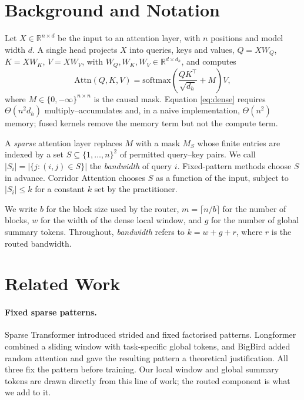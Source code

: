 \documentclass[11pt]{article}
\begin{document}
\section{Background and Notation}\label{sec:background}

Let $X \in \mathbb{R}^{n \times d}$ be the input to an attention layer, with
$n$ positions and model width $d$. A single head projects $X$ into queries,
keys and values, $Q = XW_Q$, $K = XW_K$, $V = XW_V$, with
$W_Q, W_K, W_V \in \mathbb{R}^{d \times d_h}$, and computes
\begin{equation}\label{eq:dense}
  \mathrm{Attn}(Q, K, V) = \mathrm{softmax}\!\left(
    \frac{QK^{\top}}{\sqrt{d_h}} + M \right) V,
\end{equation}
where $M \in \{0, -\infty\}^{n \times n}$ is the causal mask. Equation
\eqref{eq:dense} requires $\Theta(n^2 d_h)$ multiply--accumulates and, in a
naive implementation, $\Theta(n^2)$ memory; fused kernels
\citep{dao2022flashattention} remove the memory term but not the compute term.

A \emph{sparse} attention layer replaces $M$ with a mask $M_S$ whose finite
entries are indexed by a set $S \subseteq \{1,\dots,n\}^2$ of permitted
query--key pairs. We call $|S_i| = |\{j : (i,j) \in S\}|$ the
\emph{bandwidth} of query $i$. Fixed-pattern methods choose $S$ in advance.
Corridor Attention chooses $S$ as a function of the input, subject to
$|S_i| \le k$ for a constant $k$ set by the practitioner.

We write $b$ for the block size used by the router, $m = \lceil n/b \rceil$ for
the number of blocks, $w$ for the width of the dense local window, and $g$ for
the number of global summary tokens. Throughout, \emph{bandwidth} refers to
$k = w + g + r$, where $r$ is the routed bandwidth.

\section{Related Work}\label{sec:related}

\paragraph{Fixed sparse patterns.} Sparse Transformer
\citep{child2019sparse} introduced strided and fixed factorised patterns.
Longformer \citep{beltagy2020longformer} combined a sliding window with
task-specific global tokens, and BigBird \citep{zaheer2020bigbird} added
random attention and gave the resulting pattern a theoretical justification.
All three fix the pattern before training. Our local window and global summary
tokens are drawn directly from this line of work; the routed component is what
we add to it.
\end{document}
